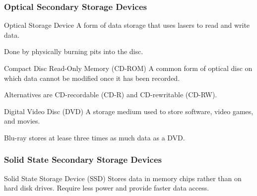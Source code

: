 \documentclass[\main/notes.tex]{subfiles}
\begin{document}
				\subsubsection{Optical Secondary Storage Devices}
					\begin{definition}{Optical Storage Device}
						A form of data storage that uses lasers to read and write data.

						Done by physically burning pits into the disc.
					\end{definition}
					\begin{definition}{Compact Disc Read-Only Memory (CD-ROM)}
						A common form of optical disc on which data cannot be modified once it has been recorded.

						Alternatives are CD-recordable (CD-R) and CD-rewritable (CD-RW).
					\end{definition}
					\begin{definition}{Digital Video Disc (DVD)}
						A storage medium used to store software, video games, and movies.

						Blu-ray stores at lease three times as much data as a DVD.
					\end{definition}
				\subsubsection{Solid State Secondary Storage Devices}
					\begin{definition}{Solid State Storage Device (SSD)}
						Stores data in memory chips rather than on hard disk drives. Require less power and provide faster data access.
					\end{definition}
			\pagebreak
\end{document}
